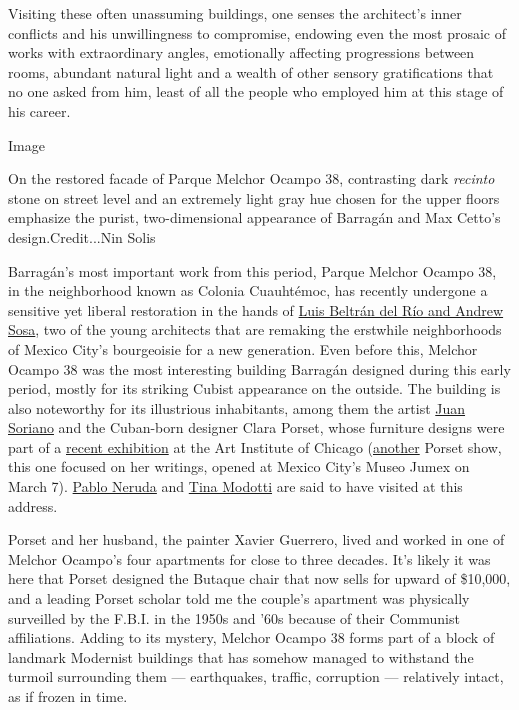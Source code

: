 Visiting these often unassuming buildings, one senses the architect's
inner conflicts and his unwillingness to compromise, endowing even the
most prosaic of works with extraordinary angles, emotionally affecting
progressions between rooms, abundant natural light and a wealth of other
sensory gratifications that no one asked from him, least of all the
people who employed him at this stage of his career.

Image

On the restored facade of Parque Melchor Ocampo 38, contrasting dark
\emph{recinto} stone on street level and an extremely light gray hue
chosen for the upper floors emphasize the purist, two-dimensional
appearance of Barragán and Max Cetto's design.Credit...Nin Solis

Barragán's most important work from this period, Parque Melchor Ocampo
38, in the neighborhood known as Colonia Cuauhtémoc, has recently
undergone a sensitive yet liberal restoration in the hands of
\href{http://www.vrtical.mx/about/}{Luis Beltrán del Río and Andrew
Sosa}, two of the young architects that are remaking the erstwhile
neighborhoods of Mexico City's bourgeoisie for a new generation. Even
before this, Melchor Ocampo 38 was the most interesting building
Barragán designed during this early period, mostly for its striking
Cubist appearance on the outside. The building is also noteworthy for
its illustrious inhabitants, among them the artist
\href{https://www.philamuseum.org/exhibitions/2008/285.html?page=2}{Juan
Soriano} and the Cuban-born designer Clara Porset, whose furniture
designs were part of a
\href{https://www.artic.edu/exhibitions/9198/in-a-cloud-in-a-wall-in-a-chair-six-modernists-in-mexico-at-midcentury}{recent
exhibition} at the Art Institute of Chicago
(\href{https://www.fundacionjumex.org/en/exposiciones/189-clara-porset-diseno-y-pensamiento}{another}
Porset show, this one focused on her writings, opened at Mexico City's
Museo Jumex on March 7).
\href{https://www.nytimes.com/2015/12/20/travel/pablo-neruda-chile.html}{Pablo
Neruda} and
\href{https://lens.blogs.nytimes.com/2017/08/24/tina-modotti-edward-weston-photography/}{Tina
Modotti} are said to have visited at this address.

Porset and her husband, the painter Xavier Guerrero, lived and worked in
one of Melchor Ocampo's four apartments for close to three decades. It's
likely it was here that Porset designed the Butaque chair that now sells
for upward of \$10,000, and a leading Porset scholar told me the
couple's apartment was physically surveilled by the F.B.I. in the 1950s
and '60s because of their Communist affiliations. Adding to its mystery,
Melchor Ocampo 38 forms part of a block of landmark Modernist buildings
that has somehow managed to withstand the turmoil surrounding them ---
earthquakes, traffic, corruption --- relatively intact, as if frozen in
time.

